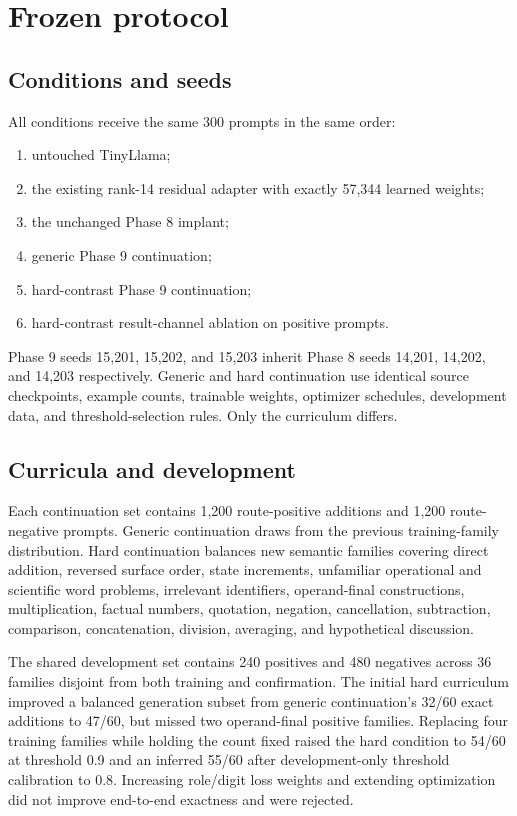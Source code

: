 \documentclass[11pt]{article}
\begin{document}
\section{Frozen protocol}

\subsection{Conditions and seeds}

All conditions receive the same 300 prompts in the same order:

\begin{enumerate}
\item untouched TinyLlama;
\item the existing rank-14 residual adapter with exactly 57,344 learned
      weights;
\item the unchanged Phase 8 implant;
\item generic Phase 9 continuation;
\item hard-contrast Phase 9 continuation;
\item hard-contrast result-channel ablation on positive prompts.
\end{enumerate}

Phase 9 seeds 15,201, 15,202, and 15,203 inherit Phase 8 seeds 14,201, 14,202,
and 14,203 respectively. Generic and hard continuation use identical source
checkpoints, example counts, trainable weights, optimizer schedules,
development data, and threshold-selection rules. Only the curriculum differs.

\subsection{Curricula and development}

Each continuation set contains 1,200 route-positive additions and 1,200
route-negative prompts. Generic continuation draws from the previous
training-family distribution. Hard continuation balances new semantic
families covering direct addition, reversed surface order, state increments,
unfamiliar operational and scientific word problems, irrelevant identifiers,
operand-final constructions, multiplication, factual numbers, quotation,
negation, cancellation, subtraction, comparison, concatenation, division,
averaging, and hypothetical discussion.

The shared development set contains 240 positives and 480 negatives across 36
families disjoint from both training and confirmation. The initial hard
curriculum improved a balanced generation subset from generic continuation's
32/60 exact additions to 47/60, but missed two operand-final positive
families. Replacing four training families while holding the count fixed
raised the hard condition to 54/60 at threshold 0.9 and an inferred 55/60
after development-only threshold calibration to 0.8. Increasing role/digit
loss weights and extending optimization did not improve end-to-end exactness
and were rejected.
\end{document}

